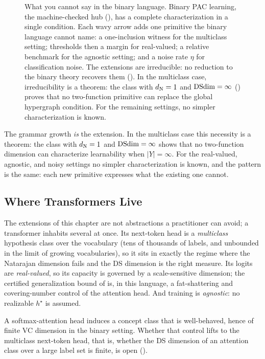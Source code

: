 \begin{figure}[ht]
\begin{tikzpicture}
\end{tikzpicture}
\caption[Grammar growth from binary PAC learning]{What you cannot say in the
binary language.  Binary PAC learning, the machine-checked hub
(), has a complete characterization in a single
condition.  Each wavy arrow adds one primitive the binary language cannot
name: a one-inclusion witness for the multiclass setting; thresholds then a
margin for real-valued; a relative benchmark for the agnostic setting; and a
noise rate $\eta$ for classification noise.  The extensions are irreducible: no
reduction to the binary theory recovers them ().  In
the multiclass case, irreducibility is a theorem: the class with $d_{\mathrm{N}} = 1$
and $\mathrm{DSdim} = \infty$ () proves that no two-function
primitive can replace the global hypergraph condition.  For the remaining
settings, no simpler characterization is known.}
\label{fig:grammar-growth}
\end{figure}


The grammar growth \emph{is} the extension.  In the multiclass case this
necessity is a theorem: the class with $d_{\mathrm{N}} = 1$ and $\mathrm{DSdim} = \infty$ shows
that no two-function dimension can characterize learnability when $|Y| = \infty$.
For the real-valued, agnostic, and noisy settings no simpler characterization is
known, and the pattern is the same: each new primitive expresses what the existing
one cannot.


\subsection{Where Transformers Live}
\label{sec:transformer-grammar}

The extensions of this chapter are not abstractions a practitioner can avoid;
a transformer inhabits several at once.  Its next-token head is a
\emph{multiclass} hypothesis class over the vocabulary (tens of thousands of
labels, and unbounded in the limit of growing vocabularies), so it sits in
exactly the regime where the Natarajan dimension fails and the DS dimension is
the right measure.  Its logits are \emph{real-valued}, so its capacity is
governed by a scale-sensitive dimension; the certified generalization bound of
 is, in this language, a fat-shattering and
covering-number control of the attention head.  And training is
\emph{agnostic}: no realizable $h^\star$ is assumed.

A softmax-attention head induces a concept class that is
well-behaved, hence of finite VC
dimension in the binary setting.  Whether that control lifts to the multiclass
next-token head, that is, whether the DS dimension of an attention class over a
large label set is finite, is open ().


